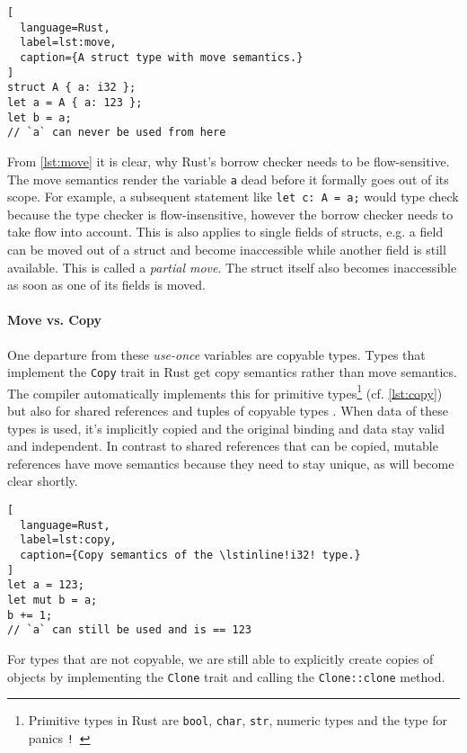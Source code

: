 \begin{lstlisting}[
  language=Rust,
  label=lst:move,
  caption={A struct type with move semantics.}
]
struct A { a: i32 };
let a = A { a: 123 };
let b = a;
// `a` can never be used from here
\end{lstlisting}

From \autoref{lst:move} it is clear, why Rust's borrow checker needs to be
flow-sensitive. The move semantics render the variable \lstinline!a! dead before
it formally goes out of its scope. For example, a subsequent statement like
\lstinline!let c: A = a;! would type check because the type checker is
flow-insensitive, however the borrow checker needs to take flow into account.
This is also applies to single fields of structs, e.g. a field can be moved
out of a struct and become inaccessible while another field is still available.
This is called a \emph{partial move}. The struct itself also becomes
inaccessible as soon as one of its fields is moved.

\paragraph{Move vs. Copy}

One departure from these \emph{use-once} \citep{use-once} variables are copyable
types. Types that implement the \passthrough{\lstinline!Copy!} trait in Rust get
copy semantics rather than move semantics. The compiler automatically implements
this for primitive types\footnote{Primitive types in Rust are \lstinline!bool!,
\lstinline!char!, \lstinline!str!, numeric types and the type for panics
\texttt{!}~\cite{rustref}} (cf. \autoref{lst:copy}) but also for shared
references and tuples of copyable types \cite[section "Special types and
traits"]{rustref}. When data of these types is used, it's implicitly copied and
the original binding and data stay valid and independent. In contrast to shared
references that can be copied, mutable references have move semantics because
they need to stay unique, as will become clear shortly.

\begin{lstlisting}[
  language=Rust,
  label=lst:copy,
  caption={Copy semantics of the \lstinline!i32! type.}
]
let a = 123;
let mut b = a;
b += 1;
// `a` can still be used and is == 123
\end{lstlisting}

For types that are not copyable, we are still able to explicitly create
copies of objects by implementing the \passthrough{\lstinline!Clone!}
trait and calling the \passthrough{\lstinline!Clone::clone!} method.

